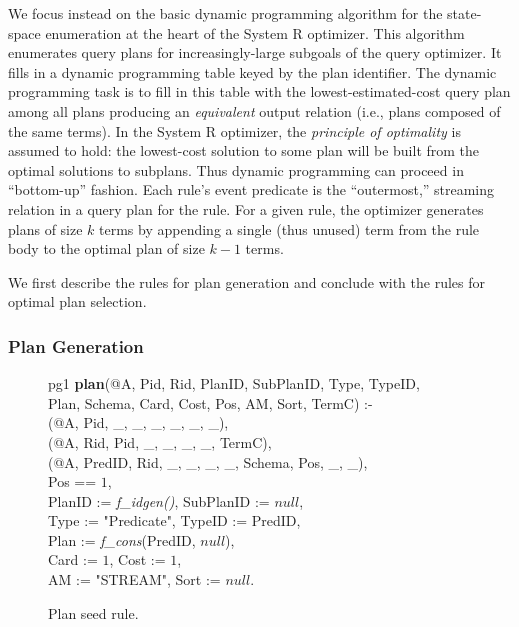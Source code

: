 We focus instead on the basic dynamic programming algorithm for the
state-space enumeration at the heart of the System R optimizer.  This
algorithm enumerates query plans for increasingly-large subgoals of the
query optimizer.  It fills in a dynamic programming table keyed by the
plan identifier.  The dynamic programming task is
to fill in this table with the lowest-estimated-cost query plan among
all plans producing an {\em equivalent} output relation (i.e., plans
composed of the same terms).  
In the System R optimizer, the {\em principle of
optimality} is assumed to hold: the lowest-cost solution to some
plan will be built from the optimal solutions to subplans.  Thus dynamic
programming can proceed in ``bottom-up'' fashion.  Each rule's event
predicate is the ``outermost,'' streaming relation in a query plan for the rule.  For a given rule,
the optimizer generates plans of size $k$ terms by appending a single
(thus unused)
term from the rule body to the optimal plan of
size $k-1$ terms.

We first describe the rules for plan generation and conclude with the
rules for optimal plan selection.

\subsubsection{Plan Generation}
\label{sec:plangen}

\begin{figure}
\ssp
\centering
\begin{boxedminipage}{\linewidth}
pg1 {\small \bf plan}(@A, Pid, Rid, PlanID, SubPlanID, Type, TypeID, \\
\datalogspace \xspace \xspace Plan, Schema, Card, Cost, Pos, AM, Sort, TermC) :- \\
(@A, Pid, \_, \_, \_, \_, \_, \_),\\
(@A, Rid, Pid, \_, \_, \_, \_, TermC),\\
(@A, PredID, Rid, \_, \_, \_, \_, Schema, Pos, \_, \_),\\
\datalogspace Pos == $1$,\\
\datalogspace PlanID := {\em f\_idgen()}, SubPlanID := $null$,\\
\datalogspace Type := "Predicate", TypeID := PredID,\\
\datalogspace Plan := {\em f\_cons}(PredID, $null$),\\
\datalogspace Card := $1$, Cost := $1$,\\
\datalogspace AM := "STREAM", Sort := $null$.
\end{boxedminipage}
\caption{\label{fig:planseed}Plan seed rule.}
\end{figure}

